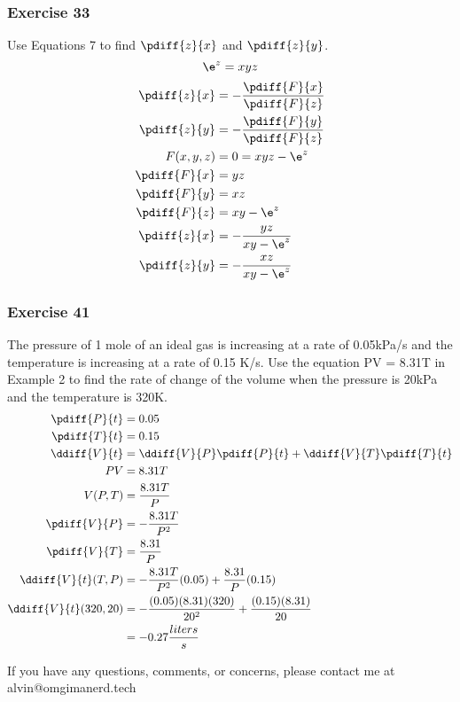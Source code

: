 \documentclass{math}
\begin{document}
\subsubsection*{Exercise 33}
Use Equations 7 to find \( \pdiff{z}{x} \) and \( \pdiff{z}{y} \).
\[ \e^z = xyz \]
\begin{align*}
  \pdiff{z}{x} &= -\frac{\pdiff{F}{x}}{\pdiff{F}{z}} \\
  \pdiff{z}{y} &= -\frac{\pdiff{F}{y}}{\pdiff{F}{z}} \\
  F(x,y,z) &= 0 = xyz-\e^z \\
  \pdiff{F}{x} &= yz \\
  \pdiff{F}{y} &= xz \\
  \pdiff{F}{z} &= xy-\e^z \\
  \pdiff{z}{x} &= -\frac{yz}{xy-\e^z} \\
  \pdiff{z}{y} &= -\frac{xz}{xy-\e^z}
\end{align*}

\subsubsection*{Exercise 41}
The pressure of 1 mole of an ideal gas is increasing at a rate of 0.05kPa/s and
the temperature is increasing at a rate of 0.15 K/s. Use the equation PV =
8.31T in Example 2 to find the rate of change of the volume when the pressure is
20kPa and the temperature is 320K.
\begin{align*}
  \pdiff{P}{t} &= 0.05 \\
  \pdiff{T}{t} &= 0.15 \\
  \ddiff{V}{t} &= \ddiff{V}{P}\pdiff{P}{t}+\ddiff{V}{T}\pdiff{T}{t} \\
  PV &= 8.31T \\
  V(P,T) &= \frac{8.31T}{P} \\
  \pdiff{V}{P} &= -\frac{8.31T}{P^2} \\
  \pdiff{V}{T} &= \frac{8.31}{P} \\
  \ddiff{V}{t}(T,P) &= -\frac{8.31T}{P^2}(0.05)+\frac{8.31}{P}(0.15) \\
  \ddiff{V}{t}(320,20) &= -\frac{(0.05)(8.31)(320)}{20^2}+
    \frac{(0.15)(8.31)}{20} \\
  &= -0.27\frac{liters}{s}
\end{align*}

\begin{center}
  If you have any questions, comments, or concerns, please contact me at
  alvin@omgimanerd.tech
\end{center}
\end{document}
